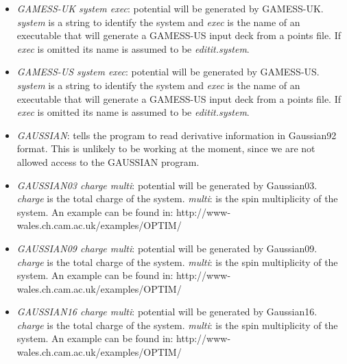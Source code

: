 \documentclass[12pt,a4paper,dvips]{article}
\begin{document}
\begin{itemize}
\item {\it GAMESS-UK system exec\/}: potential will be generated by GAMESS-UK.
{\it system\/} is a string to identify the system and {\it exec\/} is
the name of an executable that will generate a GAMESS-US input deck from a points file.
If {\it exec\/} is omitted its name is assumed to be {\it editit.system}.
 
\item {\it GAMESS-US system exec\/}: potential will be generated by GAMESS-US.
{\it system\/} is a string to identify the system and {\it exec\/} is
the name of an executable that will generate a GAMESS-US input deck from a points file.
If {\it exec\/} is omitted its name is assumed to be {\it editit.system}.

\item {\it GAUSSIAN\/}: tells the program to read derivative information in
Gaussian92 format. This is unlikely to be working at the moment, since we 
are not allowed access to the GAUSSIAN program.

\item {\it GAUSSIAN03 charge multi\/}: potential will be generated by Gaussian03.
{\it charge\/} is the total charge of the system.
{\it multi\/}: is the spin multiplicity of the system.
An example can be found in: http://www-wales.ch.cam.ac.uk/examples/OPTIM/

\item {\it GAUSSIAN09 charge multi\/}: potential will be generated by Gaussian09.
{\it charge\/} is the total charge of the system.
{\it multi\/}: is the spin multiplicity of the system.
An example can be found in: http://www-wales.ch.cam.ac.uk/examples/OPTIM/

\item {\it GAUSSIAN16 charge multi\/}: potential will be generated by Gaussian16.
{\it charge\/} is the total charge of the system.
{\it multi\/}: is the spin multiplicity of the system.
An example can be found in: http://www-wales.ch.cam.ac.uk/examples/OPTIM/



\end{itemize}
\end{document}
